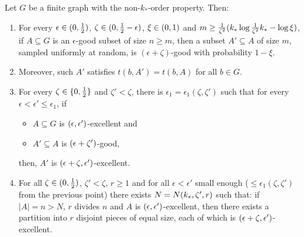         \begin{lemma} \label{lem:even_partition_of_excellent_parts}
            Let $G$ be a finite graph with the non-$k_{*}$-order property.
            Then:
            \begin{enumerate}[label={\Roman*}., ref={\Roman*}, font=\rmfamily]
                \item \label{itm:even_partition_of_excellent_parts.1} For every $\epsilon \in ( 0, \frac{1}{2} )$,
                    $\zeta \in ( 0, \frac{1}{2} - \epsilon )$, $\xi \in ( 0, 1 )$ and
                    $m \geq \frac{1}{\zeta^2}( k_* \log{\frac{1}{\zeta^2}k_*} - \log{\xi} )$,
                    if $A \subseteq G$ is an $\epsilon$-good subset of size $n \geq m$,
                    then a subset $A' \subseteq A$ of size $m$, sampled uniformly at random, is $(\epsilon + \zeta)$-good with probability $1-\xi$.
                \item \label{itm:even_partition_of_excellent_parts.1*} Moreover, such $A'$ satisfies $t(b, A') = t(b, A)$ for all $b \in G$.
                \item \label{itm:even_partition_of_excellent_parts.2} For every $\zeta \in \{ 0, \frac{1}{2} \}$ and $\zeta' < \zeta$, there is
                    $\epsilon_1 = \epsilon_1(\zeta, \zeta')$ such that for every $\epsilon < \epsilon' \leq \epsilon_1$, if
                    \begin{itemize}
                        \item $A \subseteq G$ is $( \epsilon, \epsilon' )$-excellent and
                        \item $A' \subseteq A$ is $( \epsilon + \zeta' )$-good,
                    \end{itemize}
                    then, $A'$ is $( \epsilon + \zeta, \epsilon' )$-excellent.
                \item \label{itm:even_partition_of_excellent_parts.3} For all $\zeta \in ( 0, \frac{1}{2} )$, $\zeta' < \zeta$, $r \geq 1$ and for all
                    $\epsilon < \epsilon'$ small enough ($\leq \epsilon_1(\zeta, \zeta')$ from the previous point) there exists
                    $N = N( k_{*}, \zeta', r )$ such that: if $|A| = n > N$, $r$ divides $n$ and $A$ is
                    $( \epsilon, \epsilon' )$-excellent, then there exists a partition into $r$ disjoint pieces of equal
                    size, each of which is $( \epsilon + \zeta, \epsilon' )$-excellent.

\end{enumerate}
\end{lemma}

